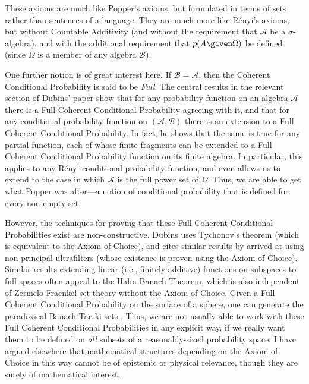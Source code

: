 These axioms are much like Popper's axioms, but formulated in terms of sets rather than sentences of a language. They are much more like R\'{e}nyi's axioms, but without Countable Additivity (and without the requirement that $\mathcal{A}$ be a $\sigma$-algebra), and with the additional  requirement that $p(A \given \Omega)$ be defined (since $\Omega$ is a member of any algebra $\mathcal{B}$).

One further notion is of great interest here. If $\mathcal{B}=\mathcal{A}$, then the Coherent Conditional Probability is said to be \textit{Full}. The central results in the relevant section of Dubins' paper show that for any probability function on an algebra $\mathcal{A}$ there is a Full Coherent Conditional Probability agreeing with it, and that for any conditional probability function on $(\mathcal{A},\mathcal{B})$ there is an extension to a Full Coherent Conditional Probability. In fact, he shows that the same is true for any partial function, each of whose finite fragments can be extended to a Full Coherent Conditional Probability function on its finite algebra. In particular, this applies to any R\'{e}nyi conditional probability function, and even allows us to extend to the case in which $\mathcal{A}$ is the full power set of $\Omega$. Thus, we are able to get what Popper was after---a notion of conditional probability that is defined for every non-empty set.

However, the techniques for proving that these Full Coherent Conditional Probabilities exist are non-constructive. Dubins uses Tychonov's theorem (which is equivalent to the Axiom of Choice), and cites similar results by \citet{krauss} arrived at using non-principal ultrafilters (whose existence is proven using the Axiom of Choice). Similar results extending linear (i.e., finitely additive) functions on subspaces to full spaces often appeal to the Hahn-Banach Theorem, which is also independent of Zermelo-Fraenkel set theory without the Axiom of Choice. Given a Full Coherent Conditional Probability on the surface of a sphere, one can generate the paradoxical Banach-Tarski sets \citep{hbbt}. Thus, we are not usually able to work with these Full Coherent Conditional Probabilities in any explicit way, if we really want them to be defined on \emph{all} subsets of a reasonably-sized probability space. I have argued elsewhere \citep{easwaranregularity} that mathematical structures depending on the Axiom of Choice in this way cannot be of epistemic or physical relevance, though they are surely of mathematical interest.

